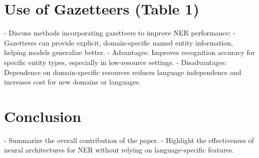 \documentclass[11pt]{article}
\begin{document}
\section*{Use of Gazetteers (Table 1)}
- Discuss methods incorporating gazetteers to improve NER performance:
  - Gazetteers can provide explicit, domain-specific named entity information, helping models generalize better.
  - Advantages: Improves recognition accuracy for specific entity types, especially in low-resource settings.
  - Disadvantages: Dependence on domain-specific resources reduces language independence and increases cost for new domains or languages.

\section*{Conclusion}
- Summarize the overall contribution of the paper.
- Highlight the effectiveness of neural architectures for NER without relying on language-specific features.
\end{document}
